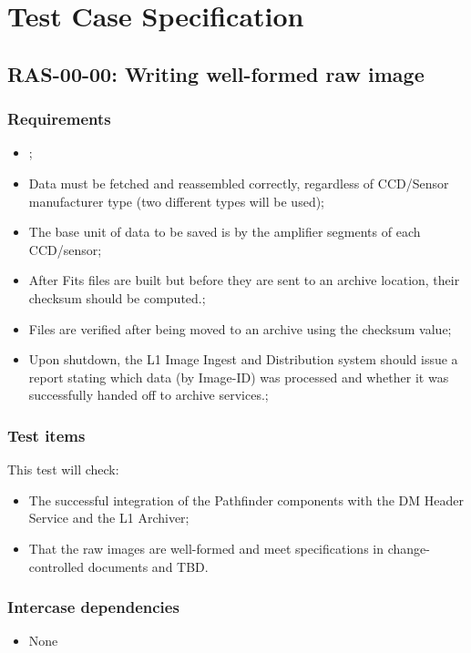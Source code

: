 \documentclass[DM,lsstdraft,STS,toc]{lsstdoc}
\begin{document}
\section{Test Case Specification}


\subsection{RAS-00-00: Writing well-formed raw image}
\label{ras-00-00}


\subsubsection{Requirements}
\begin{itemize}
\item{;}

\item {Data must be fetched and reassembled correctly, regardless of CCD/Sensor manufacturer type (two different types will be used);}
\item{The base unit of data to be saved is by the amplifier segments of each CCD/sensor;}
\item{After Fits files are built but before they are sent to an archive location, their checksum should be computed.;}
\item{Files are verified after being moved to an archive using the checksum value;}
\item{Upon shutdown, the L1 Image Ingest and Distribution system should issue a report stating which data (by Image-ID) was processed and whether it was successfully handed off to archive services.;}
\end{itemize}

\subsubsection{Test items}
This test will check:


\begin{itemize}
\item{The successful integration of the Pathfinder components with the DM Header Service and the L1 Archiver;}
\item{That the raw images are well-formed and meet specifications in change-controlled documents  and TBD.}
\end{itemize}


\subsubsection{Intercase dependencies}
\begin{itemize}
\item{None}
\end{itemize}
\end{document}
